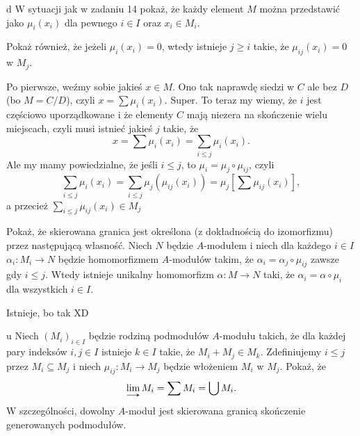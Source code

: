 \documentclass{article}
\begin{document}
\begin{problem}[15]{d}
W sytuacji jak w zadaniu 14 pokaż, że każdy element $M$ można przedstawić jako $\mu_i(x_i)$ dla pewnego $i\in I$ oraz $x_i\in M_i$.

Pokaż również, że jeżeli $\mu_i(x_i)=0$, wtedy istnieje $j\geq i$ takie, że $\mu_{ij}(x_i)=0$ w $M_j$.
\end{problem}

Po pierwsze, weźmy sobie jakieś $x\in M$. Ono tak naprawdę siedzi w $C$ ale bez $D$ (bo $M=C/D$), czyli $x=\sum \mu_i(x_i)$. Super. To teraz my wiemy, że $i$ jest częściowo uporządkowane i że elementy $C$ mają niezera na skończenie wielu miejscach, czyli musi istnieć jakieś $j$ takie, że
$$x=\sum \mu_i(x_i)=\sum_{i\leq j}\mu_i(x_i).$$
Ale my mamy powiedzialne, że jeśli $i\leq j$, to $\mu_i=\mu_j\circ\mu_{ij}$, czyli
$$\sum_{i\leq j}\mu_i(x_i)=\sum_{i\leq j}\mu_j(\mu_{ij}(x_i))=\mu_j\left[\sum\mu_{ij}(x_i)\right],$$
a przecież $\sum_{i\leq j}\mu_{ij}(x_i)\in M_j$

\begin{problem}[16]{}
Pokaż, że skierowana granica jest określona (z dokładnością do izomorfizmu) przez następującą własność. Niech $N$ będzie $A$-modułem i niech dla każdego $i\in I$ $\alpha_i:M_i\to N$ będzie homomorfizmem $A$-modułów takim, że $\alpha_i=\alpha_j\circ\mu_{ij}$ zawsze gdy $i\leq j$. Wtedy istnieje unikalny homomorfizm $\alpha:M\to N$ taki, że $\alpha_i=\alpha\circ\mu_i$ dla wszystkich $i\in I$.
\end{problem}

Istnieje, bo tak XD

\begin{center}\end{center}

\begin{problem}[17]{u}
Niech $(M_i)_{i\in I}$ będzie rodziną podmodułów $A$-modułu takich, że dla każdej pary indeksów $i,j\in I$ istnieje $k\in I$ takie, że $M_i+M_j\in M_k$. Zdefiniujemy $i\leq j$ przez $M_i\subseteq M_j$ i niech $\mu_{ij}:M_i\to M_j$ będzie włożeniem $M_i$ w $M_j$. Pokaż, że
$$\dlim M_i=\sum M_i=\bigcup M_i.$$
W szczególności, dowolny $A$-moduł jest skierowana granicą skończenie generowanych podmodułów.
\end{problem}
\end{document}
